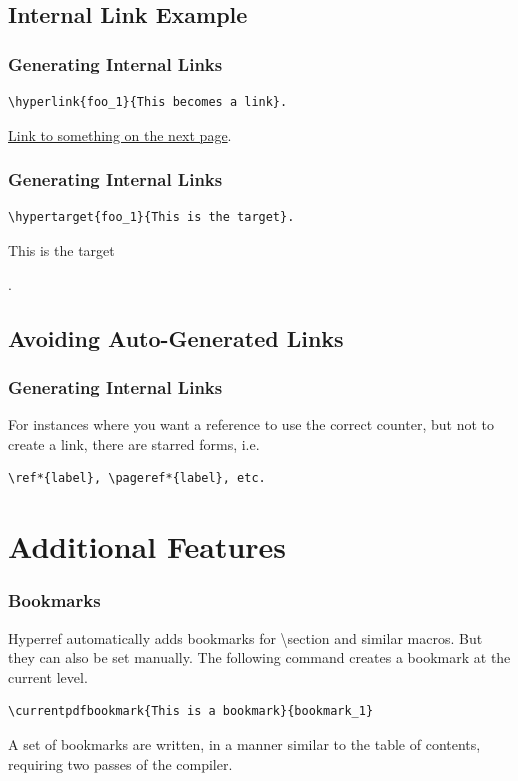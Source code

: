 \documentclass[10pt]{beamer}
\begin{document}
\subsection{Internal Link Example}
\begin{frame}[fragile]
\frametitle{Generating Internal Links}
\begin{verbatim}\hyperlink{foo_1}{This becomes a link}.
\end{verbatim}
\hyperlink{foo_1}{Link to something on the next page}.
\end{frame}

\begin{frame}[fragile]
\frametitle{Generating Internal Links}
\begin{verbatim}\hypertarget{foo_1}{This is the target}.
\end{verbatim}
\hypertarget{foo_1}{This is the target}.
\end{frame}

\subsection{Avoiding Auto-Generated Links}
\begin{frame}[fragile]
\frametitle{Generating Internal Links}
For instances where you want a reference to use the correct counter, but not to create a link,
there are starred forms, i.e. \begin{verbatim}\ref*{label}, \pageref*{label}, etc. 
\end{verbatim}
\end{frame}

\section{Additional Features}
\begin{frame}[fragile]
\frametitle{Bookmarks}
Hyperref automatically adds bookmarks for \textbackslash section and similar macros. But they can also be set manually. The following command creates a bookmark at the current level.
\begin{verbatim}\currentpdfbookmark{This is a bookmark}{bookmark_1}
\end{verbatim}
A set of bookmarks are written, in a manner similar to the table of contents, requiring two passes of the compiler. 
\end{frame}
\end{document}
